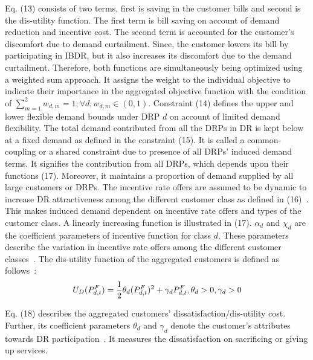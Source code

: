 \documentclass[journal]{IEEEtran}
\begin{document}
Eq. (13) consists of two terms, first is saving in the customer bills and second is the dis-utility function. The first term is bill saving on account of demand reduction and incentive cost. The second term is accounted for the customer’s discomfort due to demand curtailment. Since, the customer lowers its bill by participating in IBDR, but it also increases its discomfort due to the demand curtailment. Therefore, both functions are simultaneously being optimized using a weighted sum approach\mbox{\cite{zadeh1963optimality}}. It assigns the weight to the individual objective to indicate their importance in the aggregated objective function with the condition of $\sum\nolimits_{m = 1}^2 {{w_{d,m}}}  = 1;\forall d,{w_{d,m}} \in (0,1)$\mbox{\cite{zadeh1963optimality}}. Constraint (14) defines the upper and lower flexible demand bounds under DRP $d$ on account of limited demand flexibility. The total demand contributed from all the DRPs in DR is kept below at a fixed demand as defined in the constraint (15). It is called a common-coupling or a shared constraint due to presence of all DRPs' induced demand terms\mbox{\cite{facchinei2007generalized}}. It signifies the contribution from all DRPs, which depends upon their functions (17). Moreover, it maintains a proportion of demand supplied by all large customers or DRPs. The incentive rate offers are assumed to be dynamic to increase DR attractiveness among the different customer class as defined in (16)~\cite{zhong2012coupon}. This makes induced demand dependent on incentive rate offers and types of the customer class. A linearly increasing function is illustrated in (17). $\alpha_d$ and $\chi _d$ are the coefficient parameters of incentive function for class $d$. These parameters describe the variation in incentive rate offers among the different customer classes~\cite{zhong2012coupon,mahmoudi2017bottom}. The dis-utility function of the aggregated customers is defined as follows~\cite{yu2017incentive}:  
\begin{equation}
{U_D}(P_{d,t}^F) = \frac{1}{2}{\theta _d}{(P_{d,t}^F)^2} + {\gamma _d}P_{d,t}^F,{\rm{    }}{\theta _d} > 0,{\gamma _d} > 0
\end{equation}    

Eq. (18) describes the aggregated customers' dissatisfaction/dis-utility cost. Further, its coefficient parameters $\theta_d$ and $\gamma_d$  denote the customer's attributes towards DR participation~\cite{yu2017incentive}. It measures the dissatisfaction on sacrificing or giving up services.

\vspace{-2mm}
\end{document}
